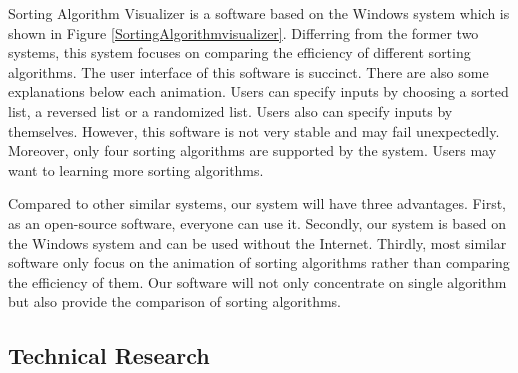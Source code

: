 \documentclass[paper=a4, fontsize=11pt,twoside]{scrartcl}		%
\begin{document}
Sorting Algorithm Visualizer is a software based on the Windows system which is shown in Figure \ref{SortingAlgorithmvisualizer}. Differring from the former two systems, this system focuses on comparing the efficiency of different sorting algorithms. The user interface of this software is succinct. There are also some explanations below each animation. Users can specify inputs by choosing a sorted list, a reversed list or a randomized list. Users also can specify inputs by themselves. However, this software is not very stable and may fail unexpectedly. Moreover, only four sorting algorithms are supported by the system. Users may want to learning more sorting algorithms.

Compared to other similar systems, our system will have three advantages. First, as an open-source software, everyone can use it. Secondly, our system is based on the Windows system and can be used without the Internet. Thirdly, most similar software only focus on the animation of sorting algorithms rather than comparing the efficiency of them. Our software will not only concentrate on single algorithm but also provide the comparison of sorting algorithms. 

\subsection{Technical Research}
\end{document}
